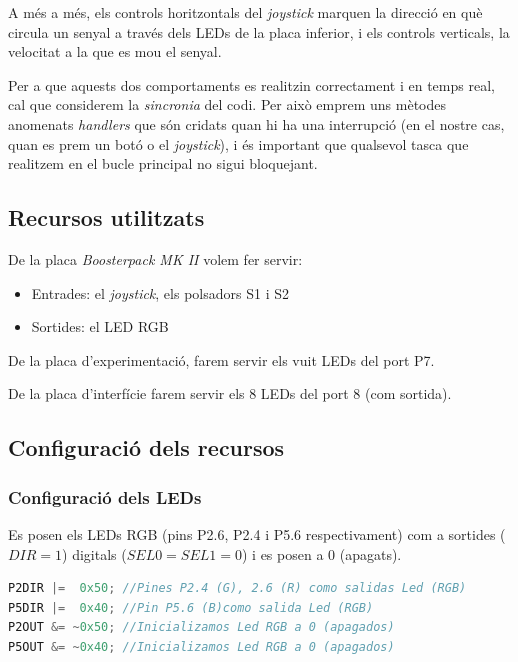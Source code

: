 \documentclass[12pt,a4paper]{article}
\begin{document}
A més a més, els controls horitzontals del \textit{joystick} marquen la direcció
en què circula un senyal a través dels LEDs de la placa inferior, i els controls
verticals, la velocitat a la que es mou el senyal.

Per a que aquests dos comportaments es realitzin correctament i en temps real,
cal que considerem la \textit{sincronia} del codi. Per això emprem uns mètodes
anomenats \textit{handlers} que són cridats quan hi ha una interrupció (en el
nostre cas, quan es prem un botó o el \textit{joystick}), i és important que
qualsevol tasca que realitzem en el bucle principal no sigui bloquejant.

\subsection{Recursos utilitzats}
De la placa \textit{Boosterpack MK II} volem fer servir:

\begin{itemize}
    \item Entrades: el \textit{joystick}, els polsadors S1 i S2
    \item Sortides: el LED RGB
\end{itemize}

De la placa d'experimentació, farem servir els vuit LEDs del port P7.

De la placa d'interfície farem servir els 8 LEDs del port 8 (com sortida).

\subsection{Configuració dels recursos}
\subsubsection{Configuració dels LEDs}
Es posen els LEDs RGB (pins P2.6, P2.4 i P5.6 respectivament) com a sortides ($DIR = 1$) digitals ($SEL0 = SEL1 = 0$) i es posen a 0 (apagats).

\begin{lstlisting}[language=C]
P2DIR |=  0x50; //Pines P2.4 (G), 2.6 (R) como salidas Led (RGB)
P5DIR |=  0x40; //Pin P5.6 (B)como salida Led (RGB)
P2OUT &= ~0x50; //Inicializamos Led RGB a 0 (apagados)
P5OUT &= ~0x40; //Inicializamos Led RGB a 0 (apagados)
\end{lstlisting}
\end{document}
